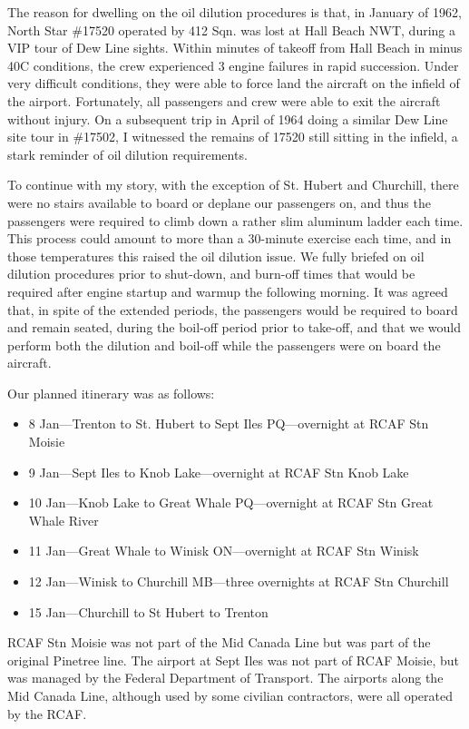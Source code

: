 The reason for dwelling on the oil dilution procedures is that, in
January of 1962, North Star \#17520 operated by 412 Sqn. was lost at Hall
Beach NWT, during a VIP tour of Dew Line sights. Within minutes of
takeoff from Hall Beach in minus 40C conditions, the crew experienced 3
engine failures in rapid succession. Under very difficult conditions,
they were able to force land the aircraft on the infield of the
airport. Fortunately, all passengers and crew were able to exit the
aircraft without injury. On a subsequent trip in April of 1964 doing a
similar Dew Line site tour in \#17502, I witnessed the remains of 17520
still sitting in the infield, a stark reminder of oil dilution
requirements.

To continue with my story, with the exception of St. Hubert and
Churchill, there were no stairs available to board or deplane our
passengers on, and thus the passengers were required to climb down a
rather slim aluminum ladder each time. This process could amount to
more than a 30-minute exercise each time, and in those temperatures
this raised the oil dilution issue. We fully briefed on oil dilution
procedures prior to shut-down, and burn-off times that would be
required after engine startup and warmup the following morning. It was
agreed that, in spite of the extended periods, the passengers would be
required to board and remain seated, during the boil-off period prior
to take-off, and that we would perform both the dilution and boil-off
while the passengers were on board the aircraft.

Our planned itinerary was as follows:

\begin{itemize}
  \item 8 Jan---Trenton to St. Hubert to Sept Iles PQ---overnight at RCAF Stn
Moisie 
  \item 9 Jan---Sept Iles to Knob Lake---overnight at RCAF Stn Knob Lake
  \item 10 Jan---Knob Lake to Great Whale PQ---overnight at RCAF Stn Great
Whale River 
  \item 11 Jan---Great Whale to Winisk ON---overnight at RCAF Stn
Winisk 
  \item 12 Jan---Winisk to Churchill MB---three overnights at RCAF Stn
Churchill 
  \item 15 Jan---Churchill to St Hubert to Trenton
\end{itemize}

RCAF Stn Moisie was not part of the Mid Canada Line but was part of the
original Pinetree line. The airport at Sept Iles was not part of RCAF
Moisie, but was managed by the Federal Department of Transport. The
airports along the Mid Canada Line, although used by some civilian
contractors, were all operated by the RCAF.

